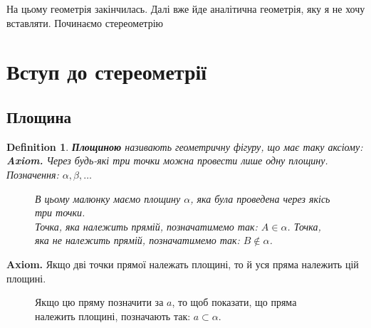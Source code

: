 \documentclass[a4paper, 10pt]{article}
\theoremstyle{theoremdd}
\theoremstyle{theoremdd}
\theoremstyle{theoremdd}
\newtheorem{definition}[theorem]{Definition}
\theoremstyle{theoremdd}
\theoremstyle{theoremdd}
\theoremstyle{theoremdd}
\theoremstyle{theoremdd}
\theoremstyle{theoremdd}
\theoremstyle{theoremdd}
\begin{document}
\iffalse
\newpage
На цьому геометрія закінчилась. Далі вже йде аналітична геометрія, яку я не хочу вставляти. Починаємо стереометрію
\newpage

\section{Вступ до стереометрії}
\subsection{Площина}
\begin{definition}
\textbf{Площиною} називають геометричну фігуру, що має таку аксіому:\\
\textbf{Axiom.} Через будь-які три точки можна провести лише одну площину.\\
Позначення: $\alpha,\beta,\dots$
\begin{figure}[H]
\centering
{}
\caption*{В цьому малюнку маємо площину $\alpha$, яка була проведена через якісь три точки. \\
Точка, яка належить прямій, позначатимемо так: $A \in \alpha$. Точка, яка не належить прямій, позначатимемо так: $B \not\in \alpha$.}
\end{figure}
\end{definition}

\textbf{Axiom.} Якщо дві точки прямої належать площині, то й уся пряма належить цій площині.

\begin{figure}[H]
\centering
{}
\caption*{Якщо цю пряму позначити за $a$, то щоб показати, що пряма належить площині, позначають так: $a \subset \alpha$.}
\end{figure}
\end{document}

